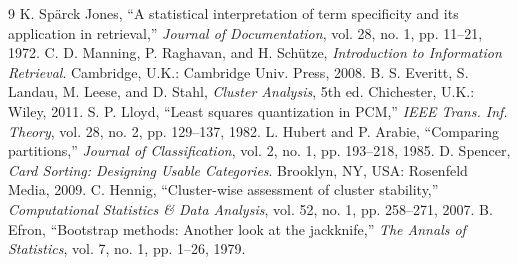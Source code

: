 \documentclass[conference]{IEEEtran}
\begin{document}
\begin{thebibliography}{9}
 K. Spärck Jones, ``A statistical interpretation of term specificity and its application in retrieval,'' \emph{Journal of Documentation}, vol. 28, no. 1, pp. 11--21, 1972.
 C. D. Manning, P. Raghavan, and H. Schütze, \emph{Introduction to Information Retrieval}. Cambridge, U.K.: Cambridge Univ. Press, 2008.
 B. S. Everitt, S. Landau, M. Leese, and D. Stahl, \emph{Cluster Analysis}, 5th ed. Chichester, U.K.: Wiley, 2011.
 S. P. Lloyd, ``Least squares quantization in PCM,'' \emph{IEEE Trans. Inf. Theory}, vol. 28, no. 2, pp. 129--137, 1982.
 L. Hubert and P. Arabie, ``Comparing partitions,'' \emph{Journal of Classification}, vol. 2, no. 1, pp. 193--218, 1985.
 D. Spencer, \emph{Card Sorting: Designing Usable Categories}. Brooklyn, NY, USA: Rosenfeld Media, 2009.
 C. Hennig, ``Cluster-wise assessment of cluster stability,'' \emph{Computational Statistics \& Data Analysis}, vol. 52, no. 1, pp. 258--271, 2007.
 B. Efron, ``Bootstrap methods: Another look at the jackknife,'' \emph{The Annals of Statistics}, vol. 7, no. 1, pp. 1--26, 1979.
\end{thebibliography}
\end{document}
